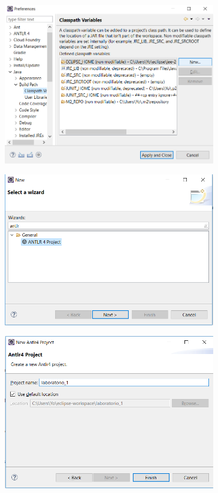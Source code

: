 \documentclass[a4paper,openright,14pt]{report}
\begin{document}
\newpage
\begin{figure}[htb]
\begin{center}
\includegraphics[width=9.2cm]{imagen7}
\end{center}
\end{figure}
\begin{figure}[htb]
\begin{center}
\includegraphics[width=9.2cm]{imagen8}
\end{center}
\end{figure}
\newpage
\begin{figure}[htb]
\begin{center}
\includegraphics[width=9.2cm]{imagen9}
\end{center}
\end{figure}
\newpage
\end{document}
